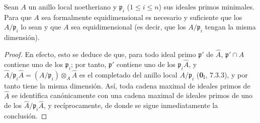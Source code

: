 \begin{proposition}[7.1.2]
\label{IV.2.s7.1.2-fr}
Sean $A$ un anillo local noetheriano y $\mathfrak p_i$
\textup{(}$1\leqslant i\leqslant
n$\textup{)} sus ideales primos minimales.
Para que $A$ sea formalmente equidimensional es necesario
y suficiente que los $A/\mathfrak p_i$ lo sean y que $A$
sea equidimensional \textup{(es decir, que los $A/\mathfrak p_i$
tengan la misma dimensión)}.
\end{proposition}

\begin{proof}
En efecto, esto se deduce de que, para todo ideal primo
$\mathfrak p'$ de $\widehat A$, $\mathfrak p'\cap A$
contiene uno de los $\mathfrak p_i$; por tanto,
$\mathfrak p'$ contiene uno de los
$\mathfrak p_i\widehat A$, y
$\widehat A/\mathfrak p_i\widehat A=(A/\mathfrak p_i)\otimes_A\widehat A$
es el completado del anillo local $A/\mathfrak p_i$
(\textbf 0$_{\mathrm I}$, 7.3.3), y por tanto tiene la misma
dimensión. Así, toda cadena maximal de ideales primos de
$\widehat A$ se identifica canónicamente con una cadena
maximal de ideales primos de uno de los
$\widehat A/\mathfrak p_i\widehat A$, y recíprocamente,
de donde se sigue inmediatamente la conclusión.
\end{proof}
